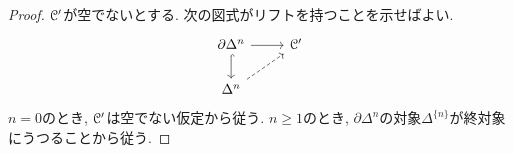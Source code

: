 \documentclass[uplatex, a4paper, 14Q, dvipdfmx]{jsreport}
\begin{document}
\begin{proof}
  $\mathcal{C}'$が空でないとする. 
  次の図式がリフトを持つことを示せばよい. 
  \[\begin{tikzcd}
    {\partial \Delta^n} & {\C'} \\
    {\Delta^n}
    \arrow[hook, from=1-1, to=2-1]
    \arrow[from=1-1, to=1-2]
    \arrow[dashed, from=2-1, to=1-2]
  \end{tikzcd}\]
  $n=0$のとき, $\mathcal{C}'$は空でない仮定から従う. 
  $n \geq 1$のとき, $\partial \Delta^n$の対象$\Delta^{\{n\}}$が終対象にうつることから従う. 
\end{proof}
\end{document}
